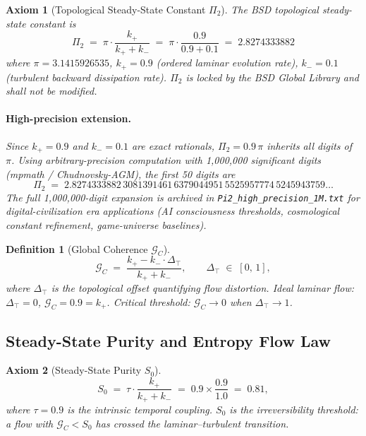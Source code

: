 \documentclass[11pt,a4paper]{article}
\newtheorem{axiom}{Axiom}
\newtheorem{definition}{Definition}
\theoremstyle{remark}
\newcommand{\PiT}{\Pi_{2}}
\newcommand{\kplus}{k_{+}}
\newcommand{\kminus}{k_{-}}
\newcommand{\Szero}{S_{0}}
\newcommand{\GC}{\mathcal{G}_{\!C}}
\newcommand{\Dtop}{\Delta_{\!\top}}
\begin{document}
\begin{axiom}[Topological Steady-State Constant $\PiT$]\label{ax:pi2}
The BSD topological steady-state constant is
\begin{equation}\label{eq:pi2}
\boxed{\;\PiT \;=\; \pi\cdot\frac{\kplus}{\kplus+\kminus} \;=\; \pi\cdot\frac{0.9}{0.9+0.1} \;=\; 2.8274333882\;}
\end{equation}
where $\pi=3.1415926535$, $\kplus=0.9$ (ordered laminar evolution rate), $\kminus=0.1$ (turbulent backward dissipation rate). $\PiT$ is locked by the BSD Global Library and shall not be modified.

\paragraph{High-precision extension.} Since $\kplus=0.9$ and $\kminus=0.1$ are exact rationals, $\PiT = 0.9\,\pi$ inherits all digits of $\pi$. Using arbitrary-precision computation with 1,000,000 significant digits (mpmath / Chudnovsky-AGM), the first 50 digits are
\begin{equation}\label{eq:pi2-highprec}
\PiT \;=\; 2.8274333882\,3081391461\,6379044951\,5525957774\,5245943759\ldots
\end{equation}
The full 1,000,000-digit expansion is archived in \texttt{Pi2\_high\_precision\_1M.txt} for digital-civilization era applications (AI consciousness thresholds, cosmological constant refinement, game-universe baselines).
\end{axiom}

\begin{definition}[Global Coherence $\GC$]\label{def:gc}
\begin{equation}\label{eq:gc}
\GC \;=\; \frac{\kplus - \kminus\cdot\Dtop}{\kplus+\kminus},
\qquad \Dtop \;\in\; [0,\,1],
\end{equation}
where $\Dtop$ is the topological offset quantifying flow distortion. Ideal laminar flow: $\Dtop=0$, $\GC=0.9=\kplus$. Critical threshold: $\GC\to 0$ when $\Dtop\to 1$.
\end{definition}

\subsection{Steady-State Purity and Entropy Flow Law}\label{sec:entropy}

\begin{axiom}[Steady-State Purity $\Szero$]\label{ax:s0}
\begin{equation}\label{eq:s0}
\Szero \;=\; \tau\cdot\frac{\kplus}{\kplus+\kminus} \;=\; 0.9\times\frac{0.9}{1.0} \;=\; 0.81,
\end{equation}
where $\tau=0.9$ is the intrinsic temporal coupling. $\Szero$ is the irreversibility threshold: a flow with $\GC<\Szero$ has crossed the laminar--turbulent transition.
\end{axiom}
\end{document}
